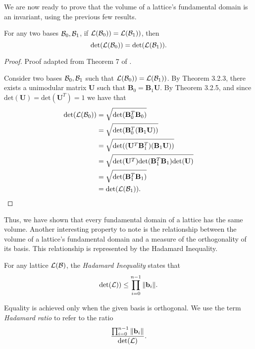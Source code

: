 \documentclass[a4paper,12pt]{article}
\begin{document}
We are now ready to prove that the volume of a lattice's fundamental domain is an invariant, using the previous few results. 

\begin{thm}
    For any two bases $\mathcal{B}_{0}, \mathcal{B}_{1}$, if $\mathcal{L}(\mathcal{B}_{0})) = \mathcal{L}(\mathcal{B}_{1}))$, then $$\text{det}(\mathcal{L}(\mathcal{B}_{0})) = \text{det}(\mathcal{L}(\mathcal{B}_{1})).$$
\end{thm}

\begin{proof}
    Proof adapted from Theorem 7 of \cite{MicciancioLec2}.

    Consider two bases $\mathcal{B}_{0}, \mathcal{B}_{1}$ such that $\mathcal{L}(\mathcal{B}_{0})) = \mathcal{L}(\mathcal{B}_{1}))$. By Theorem 3.2.3, there exists a unimodular matrix $\mathbf{U}$ such that $\mathbf{B}_{0} = \mathbf{B}_{1}\mathbf{U}$. By Theorem 3.2.5, and since $\text{det}(\mathbf{U}) = \text{det}(\mathbf{U}^{T}) = 1$ we have that 
    \begin{align*}
        \text{det}(\mathcal{L}(\mathcal{B}_{0})) &= \sqrt{\text{det}(\mathbf{B}_{0}^{T}\mathbf{B}_{0})} \\
        &= \sqrt{\text{det}(\mathbf{B}_{0}^{T}(\mathbf{B}_{1}\mathbf{U}))} \\
        &= \sqrt{\text{det}((\mathbf{U}^{T}\mathbf{B}_{1}^{T})(\mathbf{B}_{1}\mathbf{U}))} \\
        &= \sqrt{\text{det}(\mathbf{U}^{T})\text{det}(\mathbf{B}_{1}^{T}\mathbf{B}_{1})\text{det}(\mathbf{U})} \\
        &= \sqrt{\text{det}(\mathbf{B}_{1}^{T}\mathbf{B}_{1})} \\
        &= \text{det}(\mathcal{L}(\mathcal{B}_{1})).
    \end{align*}
\end{proof}

Thus, we have shown that every fundamental domain of a lattice has the same volume.
Another interesting property to note is the relationship between the volume of a lattice's fundamental domain and a measure of the orthogonality of its basis. This relationship is represented by the Hadamard Inequality. 

\begin{defn}\label{Hadamard}
For any lattice $\mathcal{L}(\mathcal{B})$, the \textit{Hadamard Inequality} states that  
$$\text{det}(\mathcal{L})) \leq \prod_{i=0}^{n-1}\| \mathbf{b}_i \|.$$
\end{defn}

Equality is achieved only when the given basis is orthogonal. We use the term \textit{Hadamard ratio} to refer to the ratio $$\frac{\prod_{i=0}^{n-1}\| \mathbf{b}_i \|}{\text{det}(\mathcal{L})}.$$
\end{document}
